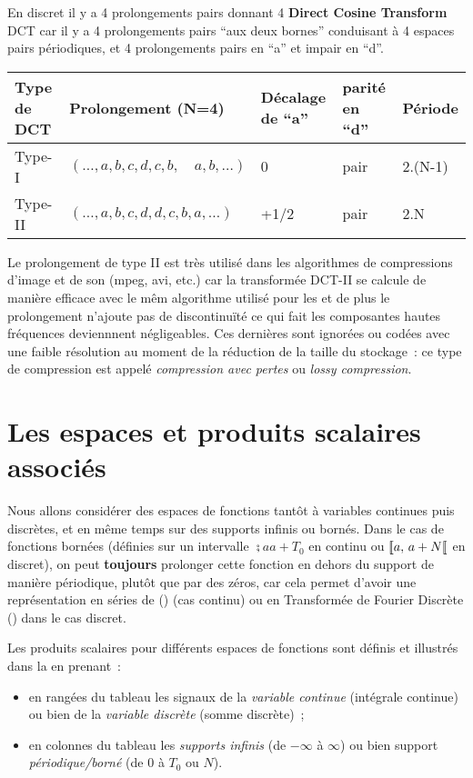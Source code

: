 \begin{remarque}
  En discret il y a 4 prolongements pairs donnant 4 \textbf{Direct
    Cosine Transform} DCT car il y a 4 prolongements pairs ``aux deux
  bornes'' conduisant à 4 espaces pairs périodiques, et 4
  prolongements pairs en ``a'' et impair en ``d''.

\begin{tabular}{lllll}
  \hline
  Type de DCT & Prolongement (N=4) & Décalage de ``a'' & parité en ``d'' &
                                                                           Période \\
  \hline
  Type-I & $(\ldots, a, b, c, d, c, b, \quad a, b, \ldots)$ & 0 & pair & 2.(N-1) \\
  Type-II & $(\dots, a, b, c, d, d, c, b, a,\dots)$ & +1/2 & pair & 2.N \\
  \hline
\end{tabular}

Le prolongement de type II est très utilisé dans les algorithmes de
compressions d'image et de son (mpeg, avi, etc.) car la transformée
DCT-II se calcule de manière efficace avec le mêm algorithme \FFT{}
utilisé pour les \TFD{} et de plus le prolongement n'ajoute pas de
discontinuïté ce qui fait les composantes hautes fréquences
deviennnent négligeables. Ces dernières sont ignorées ou codées avec
une faible résolution au moment de la réduction de la taille du
stockage~: ce type de compression est appelé \emph{compression avec
  pertes} ou \emph{lossy compression}.
\end{remarque}




\section{Les espaces et produits scalaires associés}
Nous allons considérer des espaces de fonctions tantôt à variables
continues puis discrètes, et en même temps sur des supports infinis ou
bornés. Dans le cas de fonctions bornées (définies sur un intervalle
$\semi{a}{a+T_0}$ en continu ou ${[\![ a,\,a+N[\![}$ en discret), on peut
\textbf{toujours} prolonger cette fonction en dehors du support de
manière périodique, plutôt que par des zéros, car cela permet d'avoir
une représentation en séries de \Fourier{} (\sdf{}) (cas continu) ou
en Transformée de Fourier Discrète (\TFD{}) dans le cas discret.

Les produits scalaires pour différents espaces de fonctions sont
définis et illustrés dans la  en prenant~:
\begin{itemize}
\item en rangées du tableau les signaux de la \emph{variable continue}
  (intégrale continue) ou bien de la \emph{variable discrète} (somme
  discrète)~;
\item en colonnes du tableau les \emph{supports infinis} (de $-\infty$
  à $\infty$) ou bien support \emph{périodique/borné} (de $0$ à $T_0$
  ou $N$).
\end{itemize}

